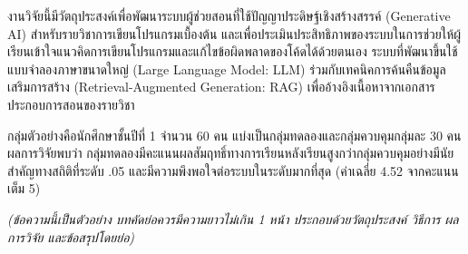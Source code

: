 \begin{abstractth}
งานวิจัยนี้มีวัตถุประสงค์เพื่อพัฒนาระบบผู้ช่วยสอนที่ใช้ปัญญาประดิษฐ์เชิงสร้างสรรค์ (Generative AI) สำหรับรายวิชาการเขียนโปรแกรมเบื้องต้น และเพื่อประเมินประสิทธิภาพของระบบในการช่วยให้ผู้เรียนเข้าใจแนวคิดการเขียนโปรแกรมและแก้ไขข้อผิดพลาดของโค้ดได้ด้วยตนเอง ระบบที่พัฒนาขึ้นใช้แบบจำลองภาษาขนาดใหญ่ (Large Language Model: LLM) ร่วมกับเทคนิคการค้นคืนข้อมูลเสริมการสร้าง (Retrieval-Augmented Generation: RAG) เพื่ออ้างอิงเนื้อหาจากเอกสารประกอบการสอนของรายวิชา

กลุ่มตัวอย่างคือนักศึกษาชั้นปีที่ 1 จำนวน 60 คน แบ่งเป็นกลุ่มทดลองและกลุ่มควบคุมกลุ่มละ 30 คน ผลการวิจัยพบว่า กลุ่มทดลองมีคะแนนผลสัมฤทธิ์ทางการเรียนหลังเรียนสูงกว่ากลุ่มควบคุมอย่างมีนัยสำคัญทางสถิติที่ระดับ .05 และมีความพึงพอใจต่อระบบในระดับมากที่สุด (ค่าเฉลี่ย 4.52 จากคะแนนเต็ม 5)

\textit{(ข้อความนี้เป็นตัวอย่าง บทคัดย่อควรมีความยาวไม่เกิน 1 หน้า ประกอบด้วยวัตถุประสงค์ วิธีการ ผลการวิจัย และข้อสรุปโดยย่อ)}
\end{abstractth}

